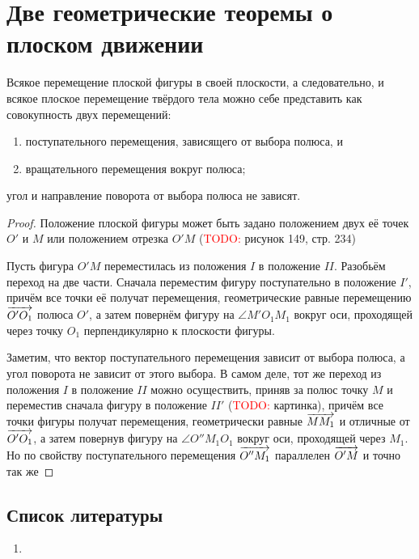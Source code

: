 \section{Две геометрические теоремы о плоском движении}

\begin{theorem}
  Всякое перемещение плоской фигуры в своей плоскости, а следовательно, и всякое
  плоское перемещение твёрдого тела можно себе представить как совокупность двух
  перемещений:
  \begin{enumerate}
    \item поступательного перемещения, зависящего от выбора полюса, и
    \item вращательного перемещения вокруг полюса;
  \end{enumerate}
  угол и направление поворота от выбора полюса не зависят.
\end{theorem}

\begin{proof}
  Положение плоской фигуры может быть задано положением двух её точек $O'$ и
  $M$ или положением отрезка $O'M$
  (\textcolor{red}{TODO:} рисунок 149, стр. 234)

  Пусть фигура $O'M$ переместилась из положения $I$ в положение $II$. Разобьём
  переход на две части. Сначала переместим фигуру поступательно в положение
  $I'$, причём все точки её получат перемещения, геометрические равные
  перемещению $\overrightarrow{O'O_1}$ полюса $O'$, а затем повернём фигуру на $\angle M'O_1
  M_1$ вокруг оси, проходящей через точку $O_1$ перпендикулярно к плоскости
  фигуры.

  Заметим, что вектор поступательного перемещения зависит от выбора полюса, а
  угол поворота не зависит от этого выбора. В самом деле, тот же переход из
  положения $I$ в положение $II$ можно осуществить, приняв за полюс точку $M$ и
  переместив сначала фигуру в положение $II'$ (\textcolor{red}{TODO:} картинка),
  причём все точки фигуры получат перемещения, геометрически равные
  $\overrightarrow{M M_1}$ и отличные от $\overrightarrow{O' O_1}$, а затем повернув фигуру на
  $\angle O'' M_1 O_1$ вокруг оси, проходящей через $M_1$. Но по свойству
  поступательного перемещения $\overrightarrow{O'' M_1}$ параллелен $\overrightarrow{O' M}$ и точно так
  же 
\end{proof}

\subsection{Список литературы}
\begin{enumerate}
  \item \cite{lourie}
\end{enumerate}

